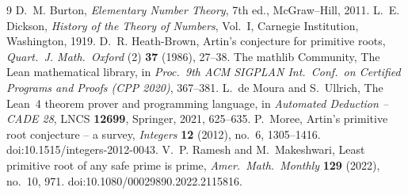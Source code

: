 \documentclass[11pt]{article}
\theoremstyle{remark}
\begin{document}
\begin{thebibliography}{9}
 D.~M. Burton, \emph{Elementary Number Theory}, 7th ed., McGraw--Hill, 2011.
 L.~E. Dickson, \emph{History of the Theory of Numbers}, Vol.~I, Carnegie
Institution, Washington, 1919.
 D.~R. Heath-Brown, Artin's conjecture for primitive roots,
\emph{Quart.\ J. Math.\ Oxford} (2) \textbf{37} (1986), 27--38.
 The mathlib Community, The Lean mathematical library, in \emph{Proc.\ 9th ACM
SIGPLAN Int.\ Conf.\ on Certified Programs and Proofs (CPP 2020)}, 367--381.
 L.~de Moura and S.~Ullrich, The Lean~4 theorem prover and programming language,
in \emph{Automated Deduction -- CADE 28}, LNCS \textbf{12699}, Springer, 2021, 625--635.
 P.~Moree, Artin's primitive root conjecture -- a survey, \emph{Integers}
\textbf{12} (2012), no.~6, 1305--1416. doi:10.1515/integers-2012-0043.
 V.~P. Ramesh and M.~Makeshwari, Least primitive root of any safe prime is prime,
\emph{Amer.\ Math.\ Monthly} \textbf{129} (2022), no.~10, 971. doi:10.1080/00029890.2022.2115816.
\end{thebibliography}
\end{document}
